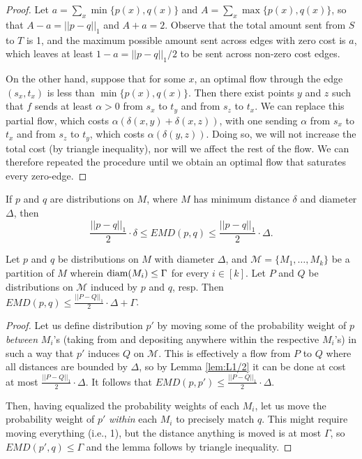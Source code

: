 \documentclass[11pt]{article}
\newcommand{\M}{\mathcal{M}}
\newcommand{\diam}{\textrm{\rm diam}}
\begin{document}
\begin{proof}
        Let $a = \sum_x \min\{p(x),q(x)\}$ and $A = \sum_x \max\{p(x),q(x)\}$, so that
        $A-a = ||p-q||_1$ and $A+a = 2$. Observe that the total amount sent from $S$ to
        $T$ is 1, and the maximum possible amount sent across edges with zero cost is $a$, which
        leaves at least $1-a = ||p-q||_1/2$ to be sent across non-zero cost edges.
        
        On the other hand, suppose that for some $x$, an optimal flow through the edge
        $(s_x,t_x)$ is less than $\min\{p(x),q(x)\}$.
        Then there exist points $y$ and $z$ such that $f$ sends at least $\alpha>0$ from $s_x$
        to $t_y$ and from $s_z$ to $t_x$. We can replace this partial flow, which costs
        $\alpha(\delta(x,y) + \delta(x,z))$, with one sending $\alpha$ from $s_x$ to $t_x$
        and from $s_z$ to $t_y$, which costs $\alpha(\delta(y,z))$. Doing so, we will not
        increase the total cost (by triangle inequality), nor will we affect the rest of the
        flow. We can therefore repeated the procedure until we obtain an optimal flow that
        saturates every zero-edge.
\end{proof}

\begin{corollary}\label{cor:EMDvsL1}
        If $p$ and $q$ are distributions on $M$, where $M$ has minimum
        distance $\delta$ and diameter $\Delta$, then
        \[
                \frac{||p-q||_1}{2}\cdot\delta \le EMD(p,q) \le \frac{||p-q||_1}{2}\cdot\Delta.
        \]
\end{corollary}

\begin{lemma}\label{lem:buckets}
        Let $p$ and $q$ be distributions on $M$ with diameter $\Delta$, and
        $\M = \{M_1,\dots,M_k\}$ be a partition of $M$ wherein $\diam(M_i)\le\Gamma$ for
        every $i\in[k]$. Let $P$ and $Q$ be distributions on $\M$
        induced by $p$ and $q$, resp. Then $EMD(p,q) \le \frac{||P-Q||_1}{2}\cdot\Delta +
        \Gamma$.
\end{lemma}

\begin{proof}
        Let us define distribution $p'$ by moving some of the probability weight of $p$
        {\em between} $M_i$'s (taking from and depositing anywhere within the respective
        $M_i$'s) in such a way that $p'$ induces $Q$ on $\M$. This is effectively a flow
        from $P$ to $Q$ where all distances are bounded by $\Delta$, so by Lemma
        \ref{lem:L1/2} it can be done at cost at most $\frac{||P-Q||_1}{2}\cdot\Delta$.
        It follows that $EMD(p,p') \le \frac{||P-Q||_1}{2}\cdot\Delta$.
        
        Then, having equalized the probability weights of each $M_i$, let us move the
        probability weight of $p'$ {\em within} each $M_i$ to precisely match $q$. This
        might require moving everything (i.e., 1), but the distance anything is moved is
        at most $\Gamma$, so $EMD(p',q) \le \Gamma$ and the lemma follows by triangle
        inequality.
\end{proof}
\end{document}
